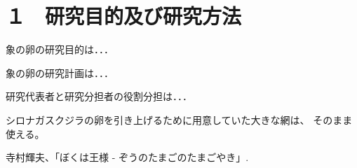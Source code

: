 
\section{１　研究目的及び研究方法}

\JSPSInstructions	%

	 象の卵の研究目的は．．．

	象の卵の研究計画は．．．

	研究代表者と研究分担者の役割分担は．．．

	シロナガスクジラの卵を引き上げるために用意していた大きな網は、
	そのまま使える。

	\vspace{1cm}
	\begin{thebibliography}{99}
		 寺村輝夫、「ぼくは王様 - ぞうのたまごのたまごやき」.
	\end{thebibliography}



